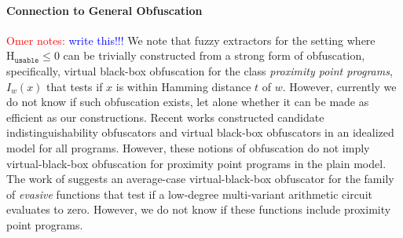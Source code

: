 \documentclass[11pt]{article}
\newcommand{\consref}[1]{\mbox{Construction~\ref{#1}}}
\newcommand{\class}[1]{{\ensuremath{\mathsf{#1}}}}
\newcommand{\gen}{\ensuremath{\class{Gen}}\xspace}
\newcommand{\Huse}{\mathrm{H}_{\mathtt{usable}}}
\newcommand{\authnote}[2]{{\textcolor{red}{\textsf{#1 notes: }\textcolor{blue}{ #2}}\marginpar{\textcolor{red}{\textbf{!!!!!}}}}}
\newcommand{\authnote}[2]{}
\newcommand{\onote}[1]{{\authnote{Omer}{#1}}}
\begin{document}

\paragraph{Connection to General Obfuscation}
 \onote{write this!!!}
We note that fuzzy extractors for the setting where $\Huse\le 0$ can be trivially constructed from a strong form of obfuscation, specifically, virtual black-box obfuscation for the class {\em proximity point programs}, $I_w(x)$ that tests if $x$ is within Hamming distance $t$ of $w$. However, currently we do not know if such obfuscation exists, let alone whether it can be made as efficient as our constructions. Recent works constructed candidate indistinguishability obfuscators \cite{GargGH0SW13,PassTS13} and virtual black-box obfuscators in an idealized model \cite{brakerski2014virtual,barak2014protecting} for all programs. However, these notions of obfuscation do not imply virtual-black-box obfuscation for proximity point programs in the plain model. The work of \cite{BarakBCKPS13} suggests an average-case virtual-black-box obfuscator for the family of {\em evasive} functions that test if a low-degree multi-variant arithmetic circuit evaluates to zero. However, we do not know if these functions include proximity point programs.
\end{document}
